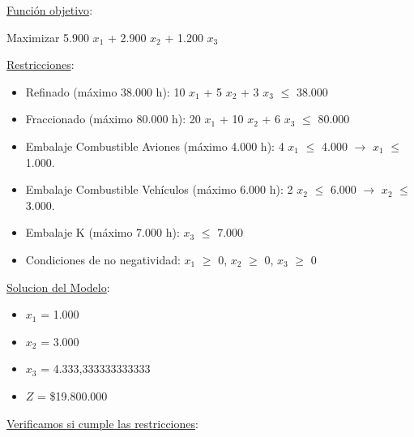 \documentclass[10pt,a4paper]{article}
\begin{document}
\begin{enumerate}[label=\textbf{\sffamily\large\arabic*.}]
\begin{itemize}
\begin{itemize}
        \end{itemize}

    \end{itemize}


    \underline{Función objetivo}: 

    \begin{center}
        
        Maximizar 5.900 $x_{1}$ + 2.900 $x_{2}$ + 1.200 $x_{3}$

    \end{center}


    \underline{Restricciones}: 

    \begin{itemize}

        \item Refinado (máximo 38.000 h): 10 $x_{1}$ + 5 $x_{2}$ + 3 $x_{3}$ $\leq$ 38.000
        \item Fraccionado (máximo 80.000 h): 20 $x_{1}$ + 10 $x_{2}$ + 6 $x_{3}$ $\leq$ 80.000
        \item Embalaje Combustible Aviones (máximo 4.000 h): 4 $x_{1}$ $\leq$ 4.000 $\rightarrow$ $x_{1}$ $\leq$ 1.000.
        \item Embalaje Combustible Vehículos (máximo 6.000 h): 2 $x_{2}$ $\leq$ 6.000 $\rightarrow$ $x_{2}$ $\leq$ 3.000.
        \item Embalaje K (máximo 7.000 h): $x_{3}$ $\leq$ 7.000
        \item Condiciones de no negatividad: $x_{1}$ $\geq$ 0, $x_{2}$ $\geq$ 0, $x_{3}$ $\geq$ 0\\

    \end{itemize}

    \clearpage

    \underline{Solucion del Modelo}: 

    \begin{itemize}

        \item $x_{1}$ = 1.000
        \item $x_{2}$ = 3.000
        \item $x_{3}$ = 4.333,333333333333
        \item $Z$ = \$19.800.000\\

    \end{itemize}

    \underline{Verificamos si cumple las restricciones}:

    \begin{itemize}


\end{itemize}
\end{enumerate}
\end{document}
